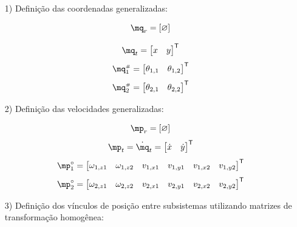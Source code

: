 \documentclass[a4paper,11pt,brazil,fleqn]{article}
\begin{document}
\begin{itemize}
\item[1)] Defini\c{c}\~ao das coordenadas generalizadas:

\begin{equation}
\mq_r = \vct{\varnothing}
\end{equation}

\begin{equation}
\mq_t = \begin{bmatrix}
x & y
\end{bmatrix}^\msT
\end{equation}
\begin{equation}
\mq_1\ssh = \begin{bmatrix}
\theta_{1,1} &
\theta_{1,2} 
\end{bmatrix}^\msT
\end{equation}
\begin{equation}
\mq_2\ssh = \begin{bmatrix}
\theta_{2,1} &
\theta_{2,2}
\end{bmatrix}^\msT
\end{equation}

\item[2)] Defini\c{c}\~ao das velocidades generalizadas:

\begin{equation}
\mp_r = \vct{\varnothing}
\end{equation}
\begin{equation}
\mp_t = \dot{\mq}_t = 
\begin{bmatrix}
\dot{x} & \dot{y}
\end{bmatrix}^\msT
\end{equation}
\begin{equation}
\mp_1\cir = \begin{bmatrix}
\omega_{1,z1} & \omega_{1,z2} & v_{1,x1} & v_{1,y1} & v_{1,x2} & v_{1,y2}
\end{bmatrix}^\msT
\end{equation}
\begin{equation}
\mp_2\cir = \begin{bmatrix}
\omega_{2,z1} & \omega_{2,z2} & v_{2,x1} & v_{2,y1} & v_{2,x2} & v_{2,y2}
\end{bmatrix}^\msT
\end{equation}

\item[3)] Defini\c{c}\~ao dos v\'inculos de posi\c{c}\~ao entre subsistemas utilizando matrizes de transforma\c{c}\~ao homog\^enea:


\end{itemize}
\end{document}
